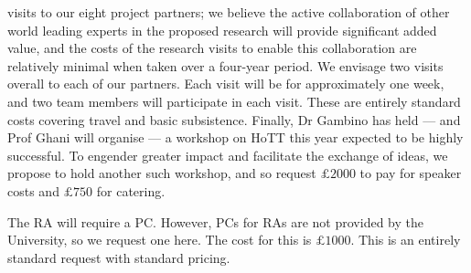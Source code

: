 \documentclass[a4paper,11pt]{article}
\begin{document}
visits to our eight project partners; we believe the active
collaboration of other world leading experts in the proposed research
will provide significant added value, and the costs of the research
visits to enable this collaboration are relatively minimal when taken
over a four-year period. We envisage two visits overall to each of our
partners. Each visit will be for approximately one week, and two team
members will participate in each visit.
These are entirely standard costs covering travel and basic
subsistence. Finally, Dr Gambino has held --- and Prof Ghani will organise --- a workshop on HoTT
this year expected to be highly successful. To engender greater impact and
facilitate the exchange of ideas, we propose to hold another such
workshop, and so request $\pounds 2000$ to pay for speaker costs and
$\pounds 750$ for catering.

\vspace{0.02in}

 The RA will require a PC. However, PCs
for RAs are not provided by the University, so we request one
here. The cost for this is $\pounds 1000$. This is an entirely
standard request with standard pricing.
\end{document}
